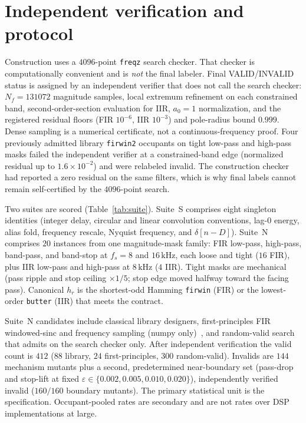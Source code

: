 \documentclass{article}
\begin{document}
\section{Independent verification and protocol}
\label{sec:protocol}

Construction uses a $4096$-point \texttt{freqz} search checker.
That checker is computationally convenient and is \emph{not} the
final labeler.
Final VALID/INVALID status is assigned by an independent verifier
that does not call the search checker: $N_f=131072$ magnitude
samples, local extremum refinement on each constrained band,
second-order-section evaluation for IIR, $a_0=1$ normalization, and
the registered residual floors (FIR $10^{-6}$, IIR $10^{-3}$) and
pole-radius bound $0.999$.
Dense sampling is a numerical certificate, not a continuous-frequency
proof.
Four previously admitted library \texttt{firwin2} occupants on tight
low-pass and high-pass masks failed the independent verifier at a
constrained-band edge (normalized residual up to $1.6\times 10^{-2}$)
and were relabeled invalid.
The construction checker had reported a zero residual on the same
filters, which is why final labels cannot remain self-certified by
the $4096$-point search.

Two suites are scored (Table~\ref{tab:suite}).
Suite~S comprises eight singleton identities (integer delay,
circular and linear convolution conventions, lag-$0$ energy, alias
fold, frequency rescale, Nyquist frequency, and $\delta[n-D]$).
Suite~N comprises $20$ instances from one magnitude-mask family:
FIR low-pass, high-pass, band-pass, and band-stop at
$f_s=8$ and $16\,\mathrm{kHz}$, each loose and tight ($16$ FIR),
plus IIR low-pass and high-pass at $8\,\mathrm{kHz}$ ($4$ IIR).
Tight masks are mechanical (pass ripple and stop ceiling
$\times 1/5$; stop edge moved halfway toward the facing pass).
Canonical $h_r$ is the shortest-odd Hamming \texttt{firwin} (FIR) or
the lowest-order \texttt{butter} (IIR) that meets the contract.

Suite~N candidates include classical library designers, first-principles
FIR windowed-sinc and frequency sampling (numpy
only)~\cite{kaiser1974window,rabiner1970freqsamp}, and random-valid
search that admits on the search checker only.
After independent verification the valid count is $412$
($88$ library, $24$ first-principles, $300$ random-valid).
Invalids are $144$ mechanism mutants plus a second, predetermined
near-boundary set (pass-drop and stop-lift at fixed
$\varepsilon\in\{0.002,0.005,0.010,0.020\}$), independently verified
invalid ($160/160$ boundary mutants).
The primary statistical unit is the specification.
Occupant-pooled rates are secondary and are not rates over DSP
implementations at large.
\end{document}
